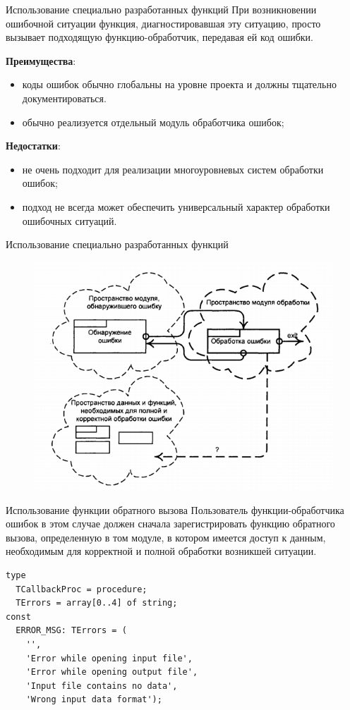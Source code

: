 \documentclass[xcolor=table]{beamer}
\begin{document}
\begin{frame}{Использование специально разработанных функций}
	При возникновении ошибочной ситуации функция, диагностировавшая эту ситуацию, просто вызывает подходящую функцию-обработчик, передавая ей код ошибки.
	
	\medskip
	\textbf{Преимущества}:
	\begin{itemize}
		\item коды ошибок обычно глобальны на уровне проекта и должны тщательно документироваться. 
		\item обычно реализуется отдельный модуль обработчика ошибок;
	\end{itemize}
	\textbf{Недостатки}:
	\begin{itemize}
		\item не очень подходит для реализации многоуровневых систем обработки ошибок;
		\item подход не всегда может обеспечить универсальный характер обработки ошибочных ситуаций.
	\end{itemize}	
\end{frame}

\begin{frame}{Использование специально разработанных функций}
	\begin{figure}[h]
		\centering
		\includegraphics[scale=0.6]{images/lec08-pic04.png}
	\end{figure}
\end{frame}

\begin{frame}[fragile]{Использование функции обратного вызова}
	Пользователь функции-обработчика ошибок в этом случае должен сначала зарегистрировать функцию обратного вызова, определенную в том модуле, в котором имеется доступ к данным, необходимым для корректной и полной обработки возникшей ситуации. 
	\begin{verbatim}
type
  TCallbackProc = procedure;
  TErrors = array[0..4] of string;
const
  ERROR_MSG: TErrors = (
    '',
    'Error while opening input file',
    'Error while opening output file',
    'Input file contains no data',
    'Wrong input data format');   
	\end{verbatim}
\end{frame}
\end{document}
